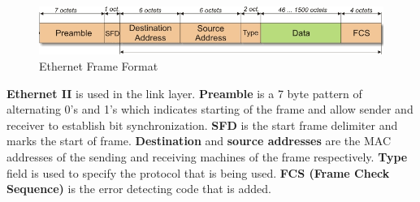 \documentclass[a4paper,10pt]{article}
\newlength{\strutheight}
\begin{document}
\begin{enumerate}
\begin{adjustbox}{valign=T,raise=\strutheight,minipage={\linewidth}}
		\begin{figure}
			\includegraphics[width=12cm]{Images/ethernet_frame}
			\caption{Ethernet Frame Format}
		\end{figure}
		\strut{}
		\textbf{Ethernet II} is used in the link layer. \textbf{Preamble} is a 7 byte pattern of alternating 0's and 1's which indicates starting of the frame and allow sender and receiver to establish bit synchronization. \textbf{SFD} is the start frame delimiter and marks the start of frame. \textbf{Destination} and \textbf{source addresses} are the MAC addresses of the sending and receiving machines of the frame respectively. \textbf{Type} field is used to specify the protocol that is being used. \textbf{FCS (Frame Check Sequence)} is the error detecting code that is added. 
	\end{adjustbox} 
\end{enumerate}
\end{document}
